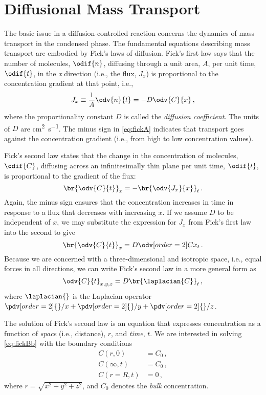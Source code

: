 \section{Diffusional Mass Transport} %
\label{sec:mass_trans}
The basic issue in a diffusion-controlled reaction concerns the dynamics of mass transport in the condensed phase. 
The fundamental equations describing mass transport are embodied by Fick's laws of diffusion. 
Fick's first law says that the number of molecules, \( \odif{n} \), diffusing through a unit area, \( A \), per unit time, \( \odif{t} \), in the \emph{x} direction (i.e., the flux, \( J_x \)) is proportional to the concentration gradient at that point, i.e.,
\begin{equation}
	J_x \equiv \frac{1}{A}\odv{n}{t} = -D \odv{C}{x} \, ,
	\label{eq:fickA}
\end{equation}
where the proportionality constant \( D \) is called the \emph{diffusion coefficient}. 
The units of \( D \) are \unit{\cm\squared \per \s}. 
The minus sign in \cref{eq:fickA} indicates that transport goes against the concentration gradient
(i.e., from high to low concentration values).

Fick's second law states that the change in the concentration of molecules, \( \odif{C} \), diffusing
across an infinitesimally thin plane per unit time, \( \odif{t} \), is proportional to the gradient of the flux:
\begin{equation}
	\br{\odv{C}{t}}_x = - \br{\odv{J_x}{x}}_t \, .
\end{equation}
Again, the minus sign ensures that the concentration increases in time in response to a flux that decreases with increasing \( x \).
If we assume \( D \) to be independent of \( x \), we may substitute the expression for \( J_x \) from Fick's first law into the second to give
\begin{equation}
	\br{\odv{C}{t}}_x = D \odv[order={2}]{C}{x}_{t} \, .
	\label{eq:fickBa}
\end{equation}
Because we are concerned with a three-dimensional and isotropic space, i.e., equal forces in all directions, we can write Fick's second law in a more general form as 
\begin{equation}
	\odv{C}{t}_{x, y, z} = D \br{\laplacian{C}}_t \, ,
	\label{eq:fickBb}
\end{equation}
where \( \laplacian{} \) is the Laplacian operator \( \pdv[order=2]{}/{x} + \pdv[order=2]{}/{y} + \pdv[order=2]{}/{z} \).

The solution of Fick's second law is an equation that expresses concentration as a function of \emph{space} (i.e., distance), \( r \), and \emph{time}, \( t \). 
We are interested in solving \cref{eq:fickBb} with the boundary conditions 
\begin{align*}
	C(r, 0) 		&= C_0 \, , \\
	C(\infty, t) 	&= C_0 \, , \\
	C(r=R, t) 	&= 0 \, ,
\end{align*}
where \( r = \sqrt{x^2 + y^2 + z^2} \), and \( C_0 \) denotes the \emph{bulk} concentration. 

